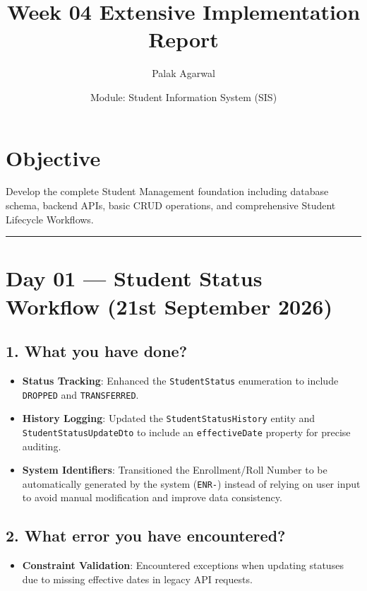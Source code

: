 \documentclass[12pt]{article}
\title{\textbf{Week 04 Extensive Implementation Report}}
\author{Palak Agarwal}
\date{Module: Student Information System (SIS)}
\begin{document}
\maketitle
\thispagestyle{fancy} %

\section*{Objective}
Develop the complete Student Management foundation including database schema, backend APIs, basic CRUD operations, and comprehensive Student Lifecycle Workflows.

\vspace{0.5cm}
\hrule
\vspace{0.5cm}

\section*{Day 01 --- Student Status Workflow (21st September 2026)}

\subsection*{1. What you have done?}
\begin{itemize}
    \item \textbf{Status Tracking}: Enhanced the \texttt{StudentStatus} enumeration to include \texttt{DROPPED} and \texttt{TRANSFERRED}.
    \item \textbf{History Logging}: Updated the \texttt{StudentStatusHistory} entity and \texttt{StudentStatusUpdateDto} to include an \texttt{effectiveDate} property for precise auditing.
    \item \textbf{System Identifiers}: Transitioned the Enrollment/Roll Number to be automatically generated by the system (\texttt{ENR-}) instead of relying on user input to avoid manual modification and improve data consistency.
\end{itemize}

\subsection*{2. What error you have encountered?}
\begin{itemize}
    \item \textbf{Constraint Validation}: Encountered exceptions when updating statuses due to missing effective dates in legacy API requests.
\end{itemize}
\end{document}
